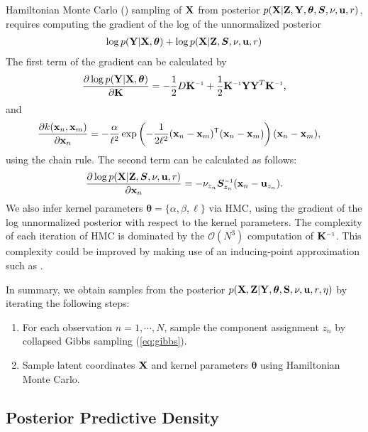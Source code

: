Hamiltonian Monte Carlo (\HMC{}) sampling of $\mathbf{X}$ from posterior ${p(\mathbf{X}|\mathbf{Z},\mathbf{Y},\bm{\theta},\bm{S},\nu,{\bf{u}},r)}$, requires computing the gradient of the log of the unnormalized posterior
%
\begin{align}
\log p(\mathbf{Y}|\mathbf{X},\bm{\theta}) + \log p(\mathbf{X}|\mathbf{Z},\bm{S},\nu,{\bf{u}},r)
\end{align}
%
The first term of the gradient can be calculated by
%
\begin{align}
\pderiv{\log p(\vY | \vX,\bm{\theta})}{\vK} = -\frac{1}{2}D\vK\inv+\frac{1}{2}\vK\inv \vY \vY^{T} \vK\inv, 
\end{align}
%
and
%
\begin{align}
\frac{\partial k({\bf{x}}_{n},{\bf{x}}_{m})}{\partial {\bf{x}}_n}
 & = -\frac{\alpha}{\ell^2} \exp \left( - \frac{1}{2 \ell^2} ({\bf{x}}_n - {\bf{x}}_m)^{\mathsf{T}} ({\bf{x}}_n - {\bf{x}}_m) \right) ({\bf{x}}_n - {\bf{x}}_m),
\end{align}
%
using the chain rule.
The second term can be calculated as follows:
\begin{align}
\frac{\partial \log p(\vX|\vZ,\bm{S},\nu,\vu,r)}{\partial \vx_{n}} 
= -\nu_{z_{n}}\bm{S}_{z_{n}}\inv(\vx_{n}-\vu_{z_{n}}).
\end{align}
We also infer kernel parameters $\bm{\theta}=\{\alpha,\beta,\ell\}$ via HMC, using the gradient of the log unnormalized posterior with respect to the kernel parameters.
The complexity of each iteration of HMC is dominated by the $\mathcal{O}(N^3)$ computation of $\vK\inv$.
This complexity could be improved by making use of an inducing-point approximation such as \citep{quinonero2005unifying,snelson2006sparse}.


In summary, we obtain samples from the posterior $p(\mathbf{X},\mathbf{Z}|\mathbf{Y},\bm{\theta},\mathbf{S},\nu,{\bf{u}},r,\eta)$ 
by iterating the following steps:
\begin{enumerate}
\item For each observation $n=1,\cdots,N$,
sample the component assignment $z_{n}$ by collapsed Gibbs sampling (\ref{eq:gibbs}).
\item Sample latent coordinates $\mathbf{X}$ and kernel parameters $\bm{\theta}$ using Hamiltonian Monte Carlo.
\end{enumerate}




\subsection{Posterior Predictive Density}

